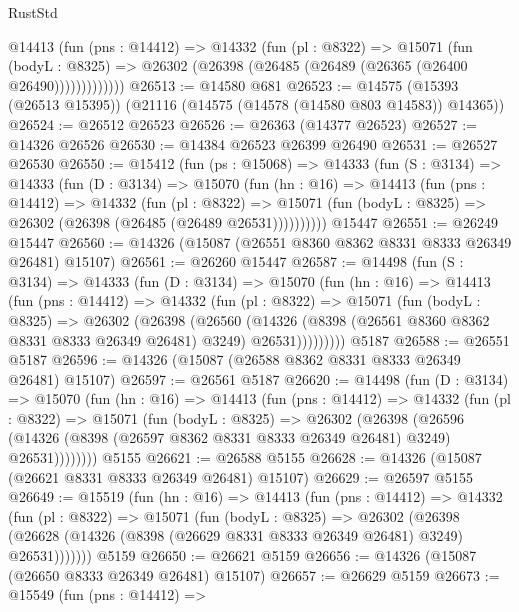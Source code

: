 \begin{lexlean}{RustStd}
\begin{coremodule}
            @14413
              (fun (pns : @14412) =>
              @14332
                (fun (pl : @8322) =>
                @15071
                  (fun (bodyL : @8325) =>
                  @26302 (@26398 (@26485 (@26489 (@26365 (@26400 @26490)))))))))))))
@26513 := @14580 @681
@26523 := @14575 (@15393 (@26513 @15395)) (@21116 (@14575 (@14578 (@14580 @803 @14583)) @14365))
@26524 := @26512 @26523
@26526 := @26363 (@14377 @26523)
@26527 := @14326 @26526
@26530 := @14384 @26523 @26399 @26490
@26531 := @26527 @26530
@26550 := @15412
    (fun (ps : @15068) =>
    @14333
      (fun (S : @3134) =>
      @14333
        (fun (D : @3134) =>
        @15070
          (fun (hn : @16) =>
          @14413
            (fun (pns : @14412) =>
            @14332
              (fun (pl : @8322) =>
              @15071 (fun (bodyL : @8325) => @26302 (@26398 (@26485 (@26489 @26531))))))))))
    @15447
@26551 := @26249 @15447
@26560 := @14326 (@15087 (@26551 @8360 @8362 @8331 @8333 @26349 @26481) @15107)
@26561 := @26260 @15447
@26587 := @14498
    (fun (S : @3134) =>
    @14333
      (fun (D : @3134) =>
      @15070
        (fun (hn : @16) =>
        @14413
          (fun (pns : @14412) =>
          @14332
            (fun (pl : @8322) =>
            @15071
              (fun (bodyL : @8325) =>
              @26302
                (@26398
                  (@26560
                    (@14326
                      (@8398 (@26561 @8360 @8362 @8331 @8333 @26349 @26481) @3249)
                      @26531)))))))))
    @5187
@26588 := @26551 @5187
@26596 := @14326 (@15087 (@26588 @8362 @8331 @8333 @26349 @26481) @15107)
@26597 := @26561 @5187
@26620 := @14498
    (fun (D : @3134) =>
    @15070
      (fun (hn : @16) =>
      @14413
        (fun (pns : @14412) =>
        @14332
          (fun (pl : @8322) =>
          @15071
            (fun (bodyL : @8325) =>
            @26302
              (@26398
                (@26596
                  (@14326 (@8398 (@26597 @8362 @8331 @8333 @26349 @26481) @3249) @26531))))))))
    @5155
@26621 := @26588 @5155
@26628 := @14326 (@15087 (@26621 @8331 @8333 @26349 @26481) @15107)
@26629 := @26597 @5155
@26649 := @15519
    (fun (hn : @16) =>
    @14413
      (fun (pns : @14412) =>
      @14332
        (fun (pl : @8322) =>
        @15071
          (fun (bodyL : @8325) =>
          @26302
            (@26398 (@26628 (@14326 (@8398 (@26629 @8331 @8333 @26349 @26481) @3249) @26531)))))))
    @5159
@26650 := @26621 @5159
@26656 := @14326 (@15087 (@26650 @8333 @26349 @26481) @15107)
@26657 := @26629 @5159
@26673 := @15549
    (fun (pns : @14412) =>

\end{coremodule}
\end{lexlean}

